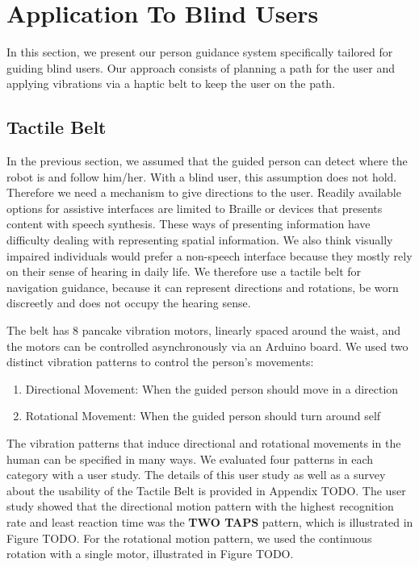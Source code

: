 \section{Application To Blind Users}
\label{sec:guidance_blind_users}

In this section, we present our person guidance system specifically tailored for guiding blind users. Our approach consists of planning a path for the user and applying vibrations via a haptic belt to keep the user on the path.


\subsection{Tactile Belt}

In the previous section, we assumed that the guided person can detect where the robot is and follow him/her. With a blind user, this assumption does not hold. Therefore we need a mechanism to give directions to the user. Readily available options for assistive interfaces are limited to Braille or devices that presents content with speech synthesis. These ways of presenting information have difficulty dealing with representing spatial information. We also think visually impaired individuals would prefer a non-speech interface because they mostly rely on their sense of hearing in daily life. We therefore use a tactile belt for navigation guidance, because it can represent directions and rotations, be worn discreetly and does not occupy the hearing sense.

The belt has 8 pancake vibration motors, linearly spaced around the waist, and the motors can be controlled asynchronously via an Arduino board. We used two distinct vibration patterns to control the person's movements:

\begin{enumerate}
\item Directional Movement: When the guided person should move in a direction
\item Rotational Movement: When the guided person should turn around self
\end{enumerate}

The vibration patterns that induce directional and rotational movements in the human can be specified in many ways. We evaluated four patterns in each category with a user study. The details of this user study as well as a survey about the usability of the Tactile Belt is provided in Appendix TODO. The user study showed that the directional motion pattern with the highest recognition rate and least reaction time was the \textbf{TWO TAPS} pattern, which is illustrated in Figure TODO. For the rotational motion pattern, we used the continuous rotation with a single motor, illustrated in Figure TODO. 

